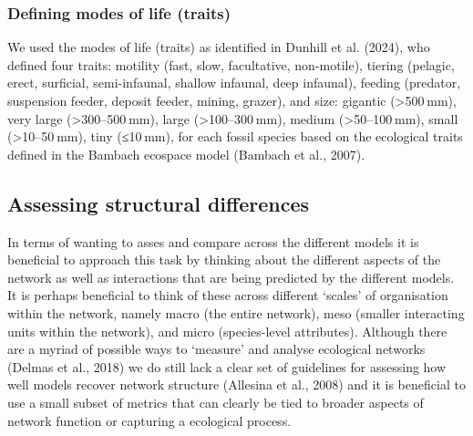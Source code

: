 \documentclass[
]{article}
\begin{document}
\subsubsection{Defining modes of life
(traits)}\label{defining-modes-of-life-traits}

We used the modes of life (traits) as identified in Dunhill et al.
(2024), who defined four traits: motility (fast, slow, facultative,
non-motile), tiering (pelagic, erect, surficial, semi-infaunal, shallow
infaunal, deep infaunal), feeding (predator, suspension feeder, deposit
feeder, mining, grazer), and size: gigantic (\textgreater500 mm), very
large (\textgreater300--500 mm), large (\textgreater100--300 mm), medium
(\textgreater50--100 mm), small (\textgreater10--50 mm), tiny (≤10 mm),
for each fossil species based on the ecological traits defined in the
Bambach ecospace model (Bambach et al., 2007).

\subsection{Assessing structural
differences}\label{assessing-structural-differences}

In terms of wanting to asses and compare across the different models it
is beneficial to approach this task by thinking about the different
aspects of the network as well as interactions that are being predicted
by the different models. It is perhaps beneficial to think of these
across different `scales' of organisation within the network, namely
macro (the entire network), meso (smaller interacting units within the
network), and micro (species-level attributes). Although there are a
myriad of possible ways to `measure' and analyse ecological networks
(Delmas et al., 2018) we do still lack a clear set of guidelines for
assessing how well models recover network structure (Allesina et al.,
2008) and it is beneficial to use a small subset of metrics that can
clearly be tied to broader aspects of network function or capturing a
ecological process.
\end{document}
